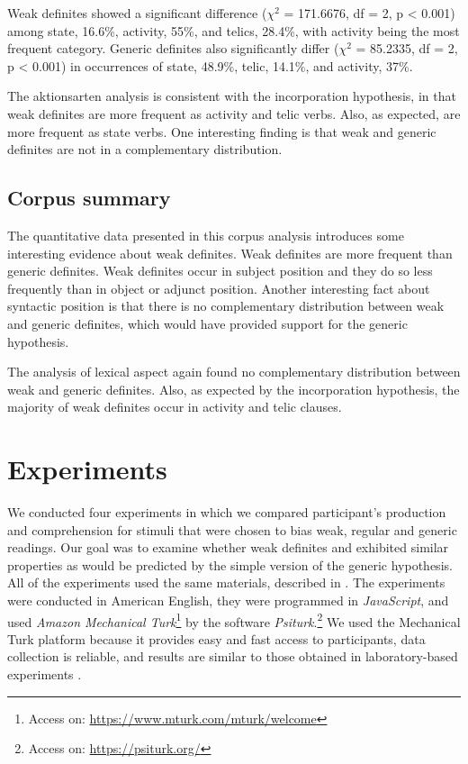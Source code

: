 \documentclass[output=paper,
modfonts
]{langscibook}
\begin{document}
Weak definites showed a significant difference ($\chi^2$ = 171.6676, df = 2, p < 0.001) among state, 16.6\%, activity, 55\%, and telics, 28.4\%, with activity being the most frequent category. Generic definites also significantly differ ($\chi^2$ = 85.2335, df = 2, p < 0.001) in occurrences of state, 48.9\%, telic, 14.1\%, and activity, 37\%.

The aktionsarten analysis is consistent with the incorporation hypothesis, in that weak definites are more frequent as activity and telic verbs. Also, as expected,  are more frequent as state verbs. One interesting finding is that weak and generic definites are not in a complementary distribution.

\subsection{Corpus summary}

The quantitative data presented in this corpus analysis introduces some interesting evidence about weak definites. Weak definites are more frequent than generic definites. Weak definites occur in subject position and they do so less frequently than in object or adjunct position. Another interesting fact about syntactic position is that there is no complementary distribution between weak and generic definites, which would have provided support for the generic hypothesis. 

The analysis of lexical aspect again found no complementary distribution between weak and generic definites. Also, as expected by the incorporation hypothesis, the majority of weak definites occur in activity and telic clauses. 
 
\section{Experiments} \label{sec:desaetal:4}

We conducted four experiments in which we compared participant’s production and comprehension for stimuli that were chosen to bias weak, regular and generic readings. Our goal was to examine whether weak definites and  exhibited similar properties as would be predicted by the simple version of the generic hypothesis.  All of the experiments used the same materials, described in . The experiments were conducted in American English, they were programmed in \textit{JavaScript}, and used \textit{Amazon Mechanical Turk}\footnote{Access on: \url{https://www.mturk.com/mturk/welcome}} by the software \textit{Psiturk}.\footnote{Access on: \url{https://psiturk.org/}}  We used the Mechanical Turk platform because it provides easy and fast access to participants, data collection is reliable, and results are similar to those obtained in laboratory-based experiments \citep[cf.][]{MasonSuri2012,PaolacciEtAlii2010}.
\end{document}
